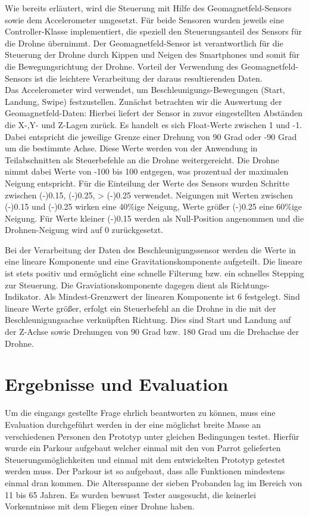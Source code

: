 \documentclass{article}
\begin{document}
Wie bereits erläutert, wird die Steuerung mit Hilfe des Geomagnetfeld-Sensors sowie dem Accelerometer umgesetzt. Für beide Sensoren wurden jeweils eine Controller-Klasse implementiert,
die speziell den Steuerungsanteil des Sensors für die Drohne übernimmt.
Der Geomagnetfeld-Sensor ist verantwortlich für die Steuerung der Drohne durch Kippen und Neigen des Smartphones und somit für die Bewegungsrichtung der Drohne.
Vorteil der Verwendung des Geomagnetfeld-Sensors ist die leichtere Verarbeitung der daraus resultierenden Daten.\\
Das Accelerometer wird verwendet, um Beschleunigungs-Bewegungen (Start, Landung, Swipe) festzustellen.
Zunächst betrachten wir die Auswertung der Geomagnetfeld-Daten: Hierbei liefert der Sensor in zuvor eingestellten Abständen die X-,Y- und Z-Lagen zurück. Es handelt es sich Float-Werte zwischen 1 und -1. Dabei entspricht die jeweilige Grenze einer Drehung von 90 Grad oder -90 Grad um die bestimmte Achse. Diese Werte werden von der Anwendung in Teilabschnitten als Steuerbefehle an die
Drohne weitergereicht. Die Drohne nimmt dabei Werte von -100 bis 100 entgegen, was prozentual der maximalen Neigung entspricht. Für die Einteilung der Werte des Sensors wurden Schritte zwischen
(-)0.15, (-)0.25, \textgreater{} (-)0.25 verwendet. Neigungen mit Werten zwischen (-)0.15 und (-)0.25 wirken eine 40\%ige Neigung, Werte größer (-)0.25 eine 60\%ige Neigung. Für Werte kleiner
(-)0.15 werden als Null-Position angenommen und die Drohnen-Neigung wird auf 0 zurückgesetzt.

Bei der Verarbeitung der Daten des Beschleunigungssensor werden die Werte in eine lineare Komponente und eine Gravitationskomponente aufgeteilt. Die lineare ist stets positiv und ermöglicht eine schnelle Filterung bzw. ein schnelles Stepping zur Steuerung. Die Graviationskomponente dagegen dient als Richtungs-Indikator.
Als Mindest-Grenzwert der linearen Komponente ist 6 festgelegt. Sind lineare Werte größer, erfolgt ein Steuerbefehl an die Drohne in die mit der Beschleunigungsachse verknüpften Richtung.
Dies sind Start und Landung auf der Z-Achse sowie Drehungen von 90 Grad bzw. 180 Grad um die Drehachse der Drohne.

\section{Ergebnisse und Evaluation}
Um die eingangs gestellte Frage ehrlich beantworten zu können, muss eine Evaluation durchgeführt werden in der eine möglichst breite Masse an verschiedenen Personen den Prototyp unter gleichen Bedingungen testet. Hierfür wurde ein Parkour aufgebaut welcher einmal mit den von Parrot gelieferten Steuerungsmöglichkeiten und einmal mit dem entwickelten Prototyp getestet werden muss. Der Parkour ist so aufgebaut, dass alle Funktionen mindestens einmal dran kommen. Die Altersspanne der sieben Probanden lag im Bereich von 11 bis 65 Jahren. Es wurden bewusst Tester ausgesucht, die keinerlei Vorkenntnisse mit dem Fliegen einer Drohne haben.
\end{document}
